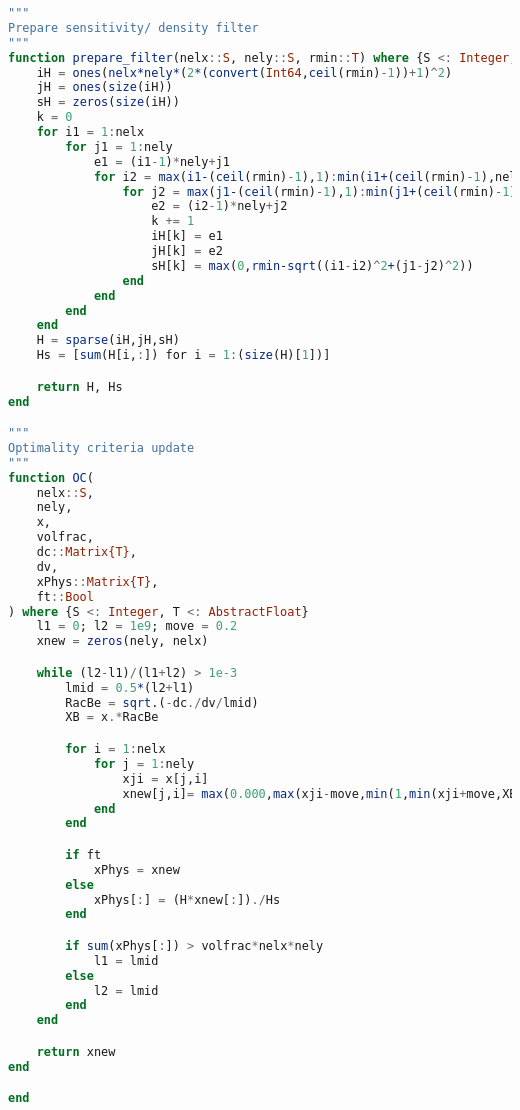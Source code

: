 \begin{lstlisting}[language=Julia, title=\texttt{top88.jl}, label={lst:top88}]
"""
Prepare sensitivity/ density filter
"""
function prepare_filter(nelx::S, nely::S, rmin::T) where {S <: Integer, T <: AbstractFloat}
    iH = ones(nelx*nely*(2*(convert(Int64,ceil(rmin)-1))+1)^2)
    jH = ones(size(iH))
    sH = zeros(size(iH))
    k = 0
    for i1 = 1:nelx
        for j1 = 1:nely
            e1 = (i1-1)*nely+j1
            for i2 = max(i1-(ceil(rmin)-1),1):min(i1+(ceil(rmin)-1),nelx)
                for j2 = max(j1-(ceil(rmin)-1),1):min(j1+(ceil(rmin)-1),nely)
                    e2 = (i2-1)*nely+j2
                    k += 1
                    iH[k] = e1
                    jH[k] = e2
                    sH[k] = max(0,rmin-sqrt((i1-i2)^2+(j1-j2)^2))
                end
            end
        end
    end
    H = sparse(iH,jH,sH)
    Hs = [sum(H[i,:]) for i = 1:(size(H)[1])]

    return H, Hs
end

"""
Optimality criteria update
"""
function OC(
    nelx::S,
    nely,
    x,
    volfrac,
    dc::Matrix{T},
    dv,
    xPhys::Matrix{T},
    ft::Bool
) where {S <: Integer, T <: AbstractFloat}
    l1 = 0; l2 = 1e9; move = 0.2
    xnew = zeros(nely, nelx)

    while (l2-l1)/(l1+l2) > 1e-3
        lmid = 0.5*(l2+l1)
        RacBe = sqrt.(-dc./dv/lmid)
        XB = x.*RacBe

        for i = 1:nelx
            for j = 1:nely
                xji = x[j,i]
                xnew[j,i]= max(0.000,max(xji-move,min(1,min(xji+move,XB[j,i]))))
            end
        end  

        if ft
            xPhys = xnew
        else
            xPhys[:] = (H*xnew[:])./Hs
        end

        if sum(xPhys[:]) > volfrac*nelx*nely
            l1 = lmid
        else 
            l2 = lmid 
        end
    end

    return xnew
end

end 
\end{lstlisting}


